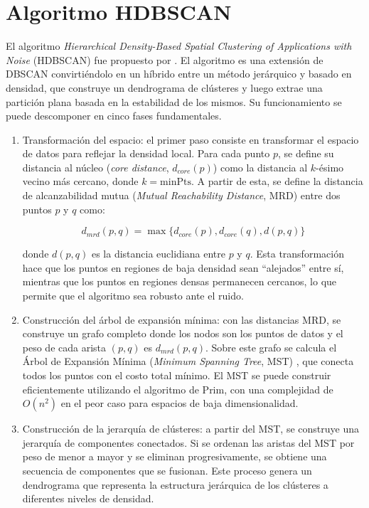 \section{Algoritmo HDBSCAN}

El algoritmo \textit{Hierarchical Density-Based Spatial Clustering of Applications with Noise} (HDBSCAN) fue propuesto por \parencite{campello2013density}. El algoritmo es una extensión de DBSCAN convirtiéndolo en un híbrido entre un método jerárquico y basado en densidad, que construye un dendrograma de clústeres y luego extrae una partición plana basada en la estabilidad de los mismos. Su funcionamiento se puede descomponer en cinco fases fundamentales.

\begin{enumerate}
\item Transformación del espacio: el primer paso consiste en transformar el espacio de datos para reflejar la densidad local. Para cada punto \(p\), se define su distancia al núcleo (\textit{core distance}, \(d_{core}(p)\)) como la distancia al \(k\)-ésimo vecino más cercano, donde \(k = \text{minPts}\). A partir de esta, se define la distancia de alcanzabilidad mutua (\textit{Mutual Reachability Distance}, MRD) entre dos puntos \(p\) y \(q\) como:

\begin{equation}
d_{mrd}(p, q) = \max\{ d_{core}(p), d_{core}(q), d(p, q) \}
\end{equation}

donde \(d(p, q)\) es la distancia euclidiana entre \(p\) y \(q\). Esta transformación hace que los puntos en regiones de baja densidad sean ``alejados'' entre sí, mientras que los puntos en regiones densas permanecen cercanos, lo que permite que el algoritmo sea robusto ante el ruido.

\item Construcción del árbol de expansión mínima: con las distancias MRD, se construye un grafo completo donde los nodos son los puntos de datos y el peso de cada arista \((p, q)\) es \(d_{mrd}(p, q)\). Sobre este grafo se calcula el Árbol de Expansión Mínima (\textit{Minimum Spanning Tree}, MST) \parencite{jainAlgorithmsClusteringData1988}, que conecta todos los puntos con el costo total mínimo. El MST se puede construir eficientemente utilizando el algoritmo de Prim\parencite{prim1957shortest}, con una complejidad de \(O(n^2)\) en el peor caso para espacios de baja dimensionalidad.

\item Construcción de la jerarquía de clústeres: a partir del MST, se construye una jerarquía de componentes conectados. Si se ordenan las aristas del MST por peso de menor a mayor y se eliminan progresivamente, se obtiene una secuencia de componentes que se fusionan. Este proceso genera un dendrograma que representa la estructura jerárquica de los clústeres a diferentes niveles de densidad.


\end{enumerate}
